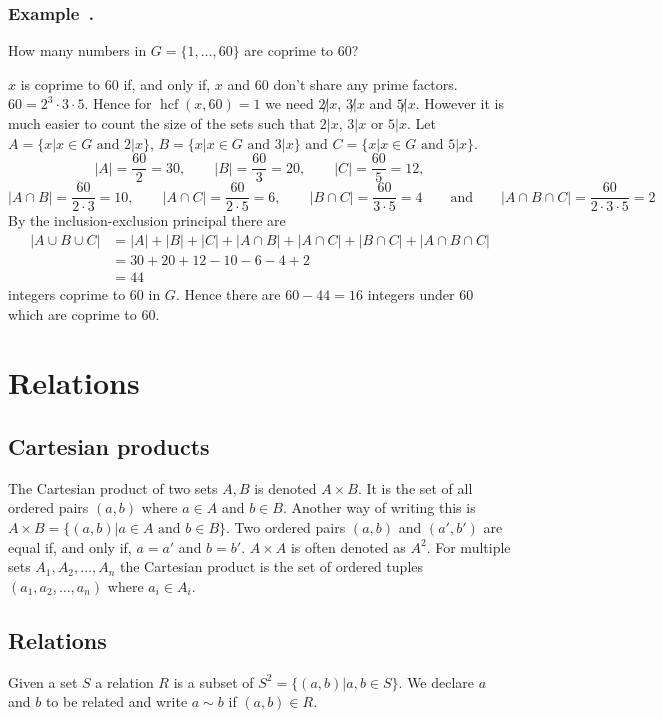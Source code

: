 \documentclass{article}
\newcommand{\hcf}{\operatorname{hcf}}
\newcounter{example}[section]
\newenvironment{example}[1][]{\refstepcounter{example}\vspace{-0.2cm}
\subsubsection*{Example~\thesection.\theexample} \rmfamily}{\par}
\begin{document}
\begin{example}
How many numbers in \(G=\{1,\dotsc,60\}\) are coprime to 60?

\(x\) is coprime to 60 if, and only if, \(x\) and 60 don't share any prime factors. \(60=2^3\cdot3\cdot5\). Hence for \(\hcf(x,60)=1\) we need \(2\not|x\), \(3\not|x\) and \(5\not|x\). However it is much easier to count the size of the sets such that \(2|x\), \(3|x\) or \(5|x\). Let \(A=\{x|x\in G\text{ and } 2|x\}\), \(B=\{x|x\in G\text{ and } 3|x\}\) and \(C=\{x|x\in G\text{ and } 5|x\}\).
\[|A|=\frac{60}{2}=30,\qquad |B|=\frac{60}{3}=20,\qquad |C|=\frac{60}{5}=12,\]
\[|A\cap B|=\frac{60}{2\cdot 3}=10,\qquad |A\cap C|=\frac{60}{2\cdot 5}=6,\qquad |B\cap C|=\frac{60}{3\cdot 5}=4\qquad\text{and}\qquad|A\cap B\cap C|=\frac{60}{2\cdot 3\cdot 5}=2\]
By the inclusion-exclusion principal there are
\begin{align*}
|A\cup B\cup C|&=|A|+|B|+|C|+|A\cap B|+|A\cap C|+|B\cap C|+|A\cap B\cap C|\\
&= 30 + 20 + 12 - 10 - 6 - 4 + 2\\
&= 44 
\end{align*}
integers coprime to 60 in \(G\). Hence there are \(60-44=16\) integers under 60 which are coprime to 60. 
\end{example}
\section{Relations}

\subsection*{Cartesian products}

The Cartesian product of two sets \(A, B\) is denoted \(A\times B\). It is the set of all ordered pairs \((a,b)\) where \(a\in A\) and \(b\in B\). Another way of writing this is \(A\times B=\{(a,b)|a\in A\text{ and }b\in B\}\). Two ordered pairs \((a,b)\) and \((a',b')\) are equal if, and only if, \(a=a'\) and \(b=b'\). \(A\times A\) is often denoted as \(A^2\). For multiple sets \(A_1,A_2,\dotsc,A_n\) the Cartesian product is the set of ordered tuples \((a_1,a_2,\dotsc,a_n)\)  where \(a_i\in A_i\).

\subsection*{Relations}

Given a set \(S\) a relation \(R\) is a subset of \(S^2=\{(a,b)|a,b\in S\}\). We declare \(a\) and \(b\) to be related and write \(a\sim b\) if \((a,b)\in R\).
\end{document}
